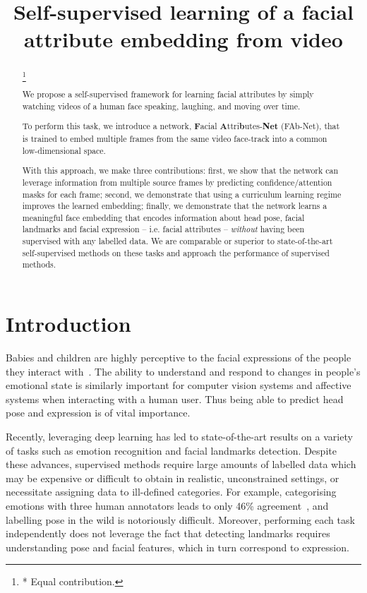 \documentclass{bmvc2k}
\title{Self-supervised learning of a facial attribute embedding from video}
\newcommand\blfootnote[1]{\begingroup
  \renewcommand\thefootnote{}\footnote{#1}\addtocounter{footnote}{-1}\endgroup
}
\def\networkname{FAb-Net}
\begin{document}
\maketitle

\begin{abstract}
\noindent 
\blfootnote{* Equal contribution.}
We propose a self-supervised framework for learning facial
attributes by simply watching videos of a
human face speaking, laughing, and moving over time.

To perform this task, we introduce  a network, \textbf{F}acial \textbf{A}ttri\textbf{b}utes-\textbf{Net} (\networkname),
that is trained to embed 
multiple frames from the same video face-track into a common low-dimensional space.

\noindent With this approach, we make three contributions: first, we show that the network can 
leverage information from multiple source frames by
predicting confidence/attention masks for each frame; second, we demonstrate that using a curriculum learning regime
  improves the learned embedding; finally,  we demonstrate
that the network learns a meaningful face embedding that encodes
information about head pose, facial landmarks and facial expression -- i.e. facial attributes --
{\em without} having been supervised with any labelled data. 
We are comparable or superior to state-of-the-art self-supervised methods on these tasks and approach the performance of supervised methods.


\end{abstract}



\section{Introduction}\label{sec:intro}
Babies and children are highly perceptive to the facial expressions of the people they interact with~\cite{gerull2002mother,ekman1979facial}.
The ability to understand and respond to changes in people's emotional state is similarly important for computer vision systems and affective systems when interacting with a human user.
Thus being able to predict head pose and expression is of vital importance.

Recently, leveraging deep learning has led to state-of-the-art results on a variety of tasks such as emotion recognition and facial landmarks detection.
Despite these advances, supervised methods require large amounts of labelled data which may be expensive or difficult to obtain in realistic, unconstrained settings,  or necessitate assigning data to ill-defined categories.
For example, categorising emotions with three human annotators leads to only 46\% agreement~\cite{barsoum2016training}, and labelling pose in the wild is notoriously difficult.
Moreover, performing each task independently does not leverage the fact that detecting landmarks requires understanding pose and facial features, which in turn correspond to expression.
\end{document}
